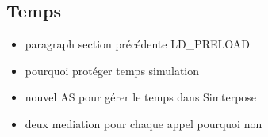 
\subsection{Temps}
\begin{itemize}
\item paragraph section précédente LD\_PRELOAD
\item pourquoi protéger temps simulation
\item nouvel AS pour gérer le temps dans Simterpose
\item deux mediation pour chaque appel pourquoi non
\end{itemize}
